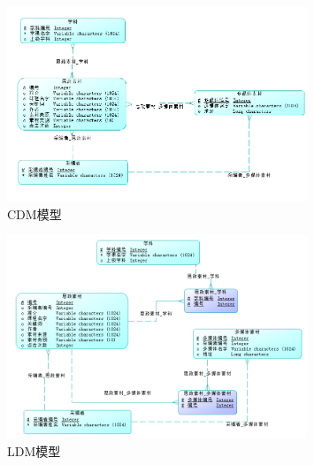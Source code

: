 \documentclass[11pt]{article}
\begin{document}
  \begin{figure}[h]
    \centering
    \includegraphics[width=0.8\textwidth]{CDM模型.png}
    \caption{CDM模型}
    \label{tab:CDMmodel}
  \end{figure}

  \begin{figure}[p]
    \centering
    \includegraphics[width=0.8\textwidth]{LDM模型.png}
    \caption{LDM模型}
    \label{tab:LDMmodel}
  \end{figure}
\end{document}
